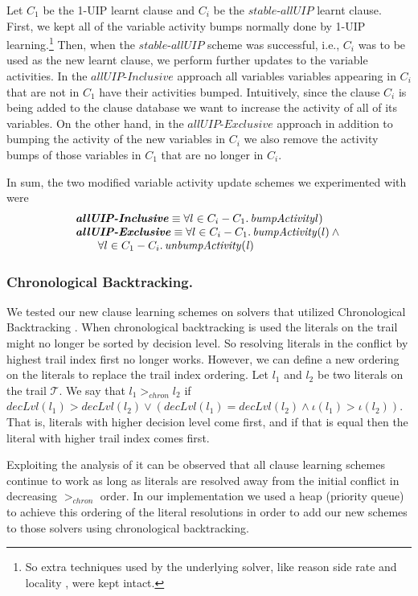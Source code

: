 \documentclass[runningheads]{llncs}
\newcommand{\allUip}{\textit{stable-allUIP}}
\newcommand{\allUipIn}{\textit{allUIP-Inclusive}}
\newcommand{\allUipEx}{\textit{allUIP-Exclusive}}
\newcommand{\trail}{\ensuremath{\mathcal{T}}}
\newcommand{\trailIdx}[1]{\ensuremath{\iota(#1)}}
\newcommand{\dlevel}[1]{\ensuremath{\mathit{decLvl}(#1)}}
\newcommand{\nf}[1]{{\color{red}{#1}}}
\begin{document}
Let $C_1$ be the 1-UIP learnt clause and $C_i$ be the $\allUip$ learnt
clause. First, we kept all of the variable activity bumps normally
done by 1-UIP learning.\footnote{So extra techniques used by the
  underlying solver, like reason side rate and locality
  \cite{DBLP:conf/sat/LiangGPC16}, were kept intact.}  Then, when the
$\allUip$ scheme was successful, i.e., $C_i$ was to be used as the new
learnt clause, we perform further updates to the variable
activities. In the $\allUipIn$ approach all variables variables
appearing in $C_i$ that are not in $C_1$ have their activities
bumped. Intuitively, since the clause $C_i$ is being added to the
clause database we want to increase the activity of all of its
variables. On the other hand, in the $\allUipEx$ approach in addition
to bumping the activity of the new variables in $C_i$ we also remove
the activity bumps of those variables in $C_1$ that are no longer in
$C_i$.

In sum, the two modified variable activity update schemes we
experimented with were
\[
    \begin{array}{l}
    \textbf{\allUipIn} \equiv \forall l\in C_i - C_1.\,\mathit{bumpActivity}l) \\
    \textbf{\allUipEx} \equiv \forall l\in C_i - C_1.\,\mathit{bumpActivity}(l) \land\mbox{} \\
    \qquad \forall l\in C_1 - C_i.\,\mathit{unbumpActivity(l)}
  \end{array}
\]

\subsubsection{Chronological Backtracking.}
We tested our new clause learning schemes on solvers that utilized
Chronological Backtracking
\cite{DBLP:conf/sat/NadelR18,DBLP:conf/sat/MohleB19}. When
chronological backtracking is used\nf{,} the literals on the trail might no
longer be sorted by decision level. So resolving literals in the
conflict by highest trail index first no longer works. However, we can
define a new ordering on the literals to replace the trail index
ordering. Let $l_1$ and $l_2$ be two literals on the trail
$\trail$. We say that $l_1 >_{\mathit{chron}} l_2$ if
$\dlevel{l_1} > \dlevel{l_2} \lor (\dlevel{l_1} = \dlevel{l_2} \land
\trailIdx{l_1} > \trailIdx{l_2})$. That is, literals with higher
decision level come first, and if that is equal then the literal with
higher trail index comes first.

Exploiting the analysis of \cite{DBLP:conf/sat/MohleB19}\nf{,} it can be
observed that all clause learning schemes continue to work as long as
literals are resolved away from the initial conflict in decreasing
$>_{\mathit{chron}}$ order. In our implementation we used a heap
(priority queue) to achieve this ordering of the literal resolutions
in order to add our new schemes to those solvers using chronological
backtracking.
\end{document}
